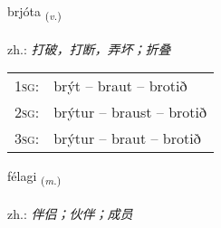 \documentclass[frontgrid, backgrid]{flacards}\usepackage[]{graphicx}\usepackage[]{xcolor}
\begin{document}
\renewcommand{\flhead}{\vskip5pt \fboxsep=0pt {\small\bfseries\footnotesize Sagnorð | 动词}}
\renewcommand{\fcfoot}{\vskip5pt \fboxsep=0pt \hspace{2pt}{\small\bfseries\footnotesize 1K}}

\renewcommand{\blhead}{\vskip5pt {\small\bfseries\footnotesize Sagnorð | 动词 }}
\renewcommand{\bcfoot}{\vskip5pt \hspace{2pt}{\small\bfseries\footnotesize 1K}}


{brjóta \small{\textsubscript{(\textit{v.})}} \\[1ex] %
\textphonetic{[prjouːta]} \\
zh.: \emph{打破，打断，弄坏；折叠} \\  [2ex]
\renewcommand*{\arraystretch}{0.8}
\begin{tabular}{p{1cm}l}
\textsc{1sg}: & brýt -- braut -- brotið \\ 
\textsc{2sg}: & brýtur -- braust -- brotið \\ 
\textsc{3sg}: & brýtur -- braut -- brotið \\ 
\end{tabular}
}

\renewcommand{\flhead}{\vskip5pt \fboxsep=0pt {\small\bfseries\footnotesize Nafnorð | 名词}}
\renewcommand{\fcfoot}{\vskip5pt \fboxsep=0pt \hspace{2pt}{\small\bfseries\footnotesize 1K}}

\renewcommand{\blhead}{\vskip5pt {\small\bfseries\footnotesize Nafnorð | 名词 }}
\renewcommand{\bcfoot}{\vskip5pt \hspace{2pt}{\small\bfseries\footnotesize 1K}}


{félagi \small{\textsubscript{(\textit{m.})}} \\[1ex] %
\textphonetic{[fjɛːlaijɪ]} \\
zh.: \emph{伴侣；伙伴；成员} \\  [2ex]
\renewcommand*{\arraystretch}{0.8}
}
\end{document}
